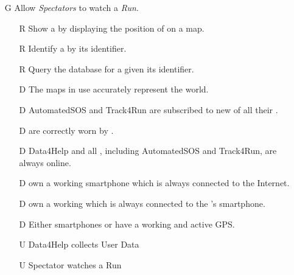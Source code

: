 \documentclass[../../../rasd.tex]{subfiles}
\begin{document}
\begin{itemize}
    \item[G\subs{10}]Allow \textit{Spectators} to watch a \textit{Run}.
    \begin{itemize}
        \item[R\subs{46}]Show a  by displaying the position of  on a map.
        \item[R\subs{47}]Identify a  by its identifier.
        \item[R\subs{48}]Query the database for a  given its identifier.
        \\
        \item[D\subs{3}]The maps in use accurately represent the world.
        \item[D\subs{6}]AutomatedSOS and Track4Run are subscribed to new  of all their .
        \item[D\subs{8}] are correctly worn by .
        \item[D\subs{9}]Data4Help and all , including AutomatedSOS and Track4Run, are always online.
        \item[D\subs{10}] own a working smartphone which is always connected to the Internet.
        \item[D\subs{11}] own a working  which is always connected to the 's smartphone.
        \item[D\subs{12}]Either smartphones or  have a working and active GPS.
        \\
        \item[U\subs{5}]Data4Help collects User Data
        \item[U\subs{16}]Spectator watches a Run
    \end{itemize}
\end{itemize}
\end{document}
